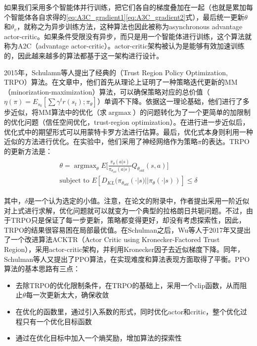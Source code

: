 \documentclass[degree=bachelor, tocarialchapter, pifootnote]{thuthesis}
\DeclareMathOperator*{\argmax}{argmax}
\begin{document}
      \par 如果我们采用多个智能体并行训练，把它们各自的梯度叠加在一起（也就是累加每个智能体各自求得的\eqref{eq:A3C_gradient1}\eqref{eq:A3C_gradient2}式），最后统一更新$\theta$和$\theta_v$，就称之为异步训练方法，这种算法也因此被称为asynchronous advantage actor-critic。如果条件受限没有异步，而只是用一个智能体进行训练，这个算法就称为A2C（advantage actor-critic）。actor-critic架构被认为是能够有效加速训练的，因此越来越多的算法都基于这一架构进行设计。\par
      2015年，Schulamn等人提出了经典的（Trust Region Policy Optimization, TRPO）算法\cite{TRPO}。在文章中，他们首先从理论上证明了一种策略迭代更新的MM（minorization-maximization）算法，可以确保策略对应的总价值（$\eta(\pi) = E_{s_0}[\sum \gamma^t r(s_t); \pi_\theta]$）单调不下降。依据这一理论基础，他们进行了多步近似，将MM算法中的优化（求$\argmax$）的问题转化为了一个更简单的加限制的优化问题（信任空间优化，trust-region optimization）。在进行进一步近似后，优化式中的期望形式可以用蒙特卡罗方法进行估算。最后，优化式本身则利用一种近似的方法进行优化。在实验中，他们采用了神经网络作为策略$\pi$的表达。TRPO的更新方法是：
      \begin{align}
        \begin{aligned}
          \theta = \argmax_\theta E\bigg[\frac{\pi_\theta(a|s)}{\pi_{\theta_{old}}(a|s)}Q_{\theta_{old}}(s, a)\bigg]\\
          \text{subject to } E[D_{KL}(\pi_{\theta_{old}}(\cdot|s)||\pi_\theta(\cdot|s))] \leq \delta
        \end{aligned}
      \end{align}
      \par 其中，$\delta$是一个认为选定的小值。注意，在论文的附录中，作者提出采用一阶近似对上式进行求解，优化问题就可以就变为一个典型的拉格朗日共轭问题\cite{Convex_optimization_book}。不过，由于TRPO只是保证了每一步更新，策略都变得更好，却没有考虑探索性，因此，TRPO的结果很容易困在局部最优值。在Schulman之后，Wu等人于2017年又提出了一个改进算法ACKTR\cite{ACKTR}（Actor Critic using Kronecker-Factored Trust Region），采用actor-critic架构，并利用Kronecker因子去近似梯度下降。同年，Schulman等人又提出了PPO算法\cite{PPO}，在实现难度和算法表现方面取得了平衡。PPO算法的基本思路有三点：
      \begin{itemize}
        \item 去除TRPO的优化限制条件，在TRPO的基础上，采用一个clip函数，从而阻止$\theta$每一次更新太大，确保收敛
        \item 在优化的函数里，通过引入系数的形式，同时优化actor和critic，整个优化过程只有一个优化目标函数
        \item 通过在优化目标中加入一个熵奖励，增加算法的探索性
      \end{itemize}
\end{document}
